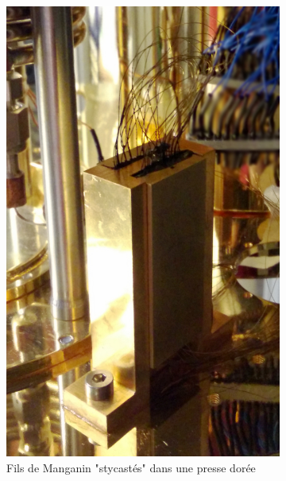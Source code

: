 \begin{figure}
    \centering
    \begin{subfigure}[t]{0.48\textwidth}
        \centering
        \includegraphics[height=1.2\textwidth]{Images/Thermalisation/DC}
        \caption{Fils de Manganin "stycastés" dans une presse dorée}
    \end{subfigure}%
    ~ 
    \begin{subfigure}[t]{0.48\textwidth}
        \centering

\end{subfigure}
\end{figure}
